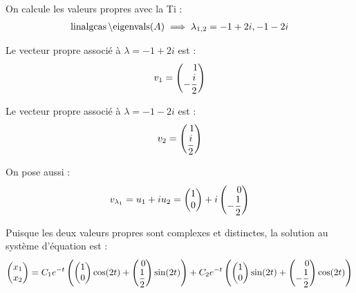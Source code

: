 On calcule les valeurs propres avec la Ti :
\begin{align*}
    \operatorname{linalgcas}\operatorname{\text{\textbackslash}eigenvals}(A)\implies\lambda_{1,2} = -1+2i,-1-2i
\end{align*}

Le vecteur propre associé à $\lambda = -1+2i$ est :
\begin{align*}
    v_1 = \begin{pmatrix*}[r]
    	1\\-\f{i}{2}
    \end{pmatrix*}
\end{align*}

Le vecteur propre associé à $\lambda = -1-2i$ est :
\begin{align*}
    v_2 = \begin{pmatrix*}[r]
    	1\\\f{i}{2}
    \end{pmatrix*}
\end{align*}

On pose aussi :
\begin{align*}
    v_{\lambda_1} = u_1 + iu_2 =
    \begin{pmatrix*}[r]
        1\\0
    \end{pmatrix*}
    +i
    \begin{pmatrix*}[r]
        0\\-\f{1}{2}
    \end{pmatrix*}
\end{align*}

Puisque les deux valeurs propres sont complexes et distinctes, 
la solution au système d'équation est :
\begin{align*}
    \begin{pmatrix*}[r]
        x_1\\x_2
    \end{pmatrix*}
    =
    C_1 e^{-t}\prt{
	\begin{pmatrix*}[r]
	    1\\0
	\end{pmatrix*}\cos(2t)
	+
	\begin{pmatrix*}[r]
	    0\\\f{1}{2}
	\end{pmatrix*}\sin(2t)
    }
    +C_2 e^{-t}\prt{
	\begin{pmatrix*}[r]
	    1\\0
	\end{pmatrix*}\sin(2t)
	+
	\begin{pmatrix*}[r]
	    0\\-\f{1}{2}
	\end{pmatrix*}\cos(2t)
    }
\end{align*}

